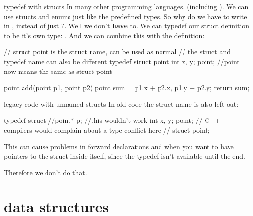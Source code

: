 \documentclass[10pt,graphics,aspectratio=169,table]{beamer}
\begin{document}
\begin{frame}[fragile]{typedef with structs}
    In many other programming languages,
    (including ).
    We can use structs and enums just like the predefined types.
    So why do we have to write  in , instead of just
     ?. Well we don't \textbf{have} to.
    We can typedef our struct definition to be it's own type:
    . And we can combine this with the definition:
    \begin{codeblock}
// struct point is the struct name, can be used as normal
// the struct and typedef name can also be different
typedef struct point{
    int x, y;
}point; //point now means the same as struct point

point add(point p1, point p2){
    point sum = {p1.x + p2.x, p1.y + p2.y};
    return sum;
}
    \end{codeblock}
\end{frame}
    \begin{frame}[fragile]{legacy code with unnamed structs}
    In old code the struct name is also left out:

    \begin{codeblock}
typedef struct{
    //point* p; //this wouldn't work
    int x, y;
}point;
// C++ compilers would complain about a type conflict here
// struct point;
    \end{codeblock}

    This can cause problems in forward declarations and when you
    want to have pointers to the struct
    inside itself, since the typedef isn't available until the end.

    Therefore we don't do that.
\end{frame}

\section{data structures}
\end{document}
